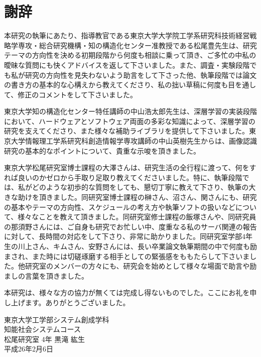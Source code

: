 \chapter*{謝辞}
本研究の執筆にあたり、指導教官である東京大学大学院工学系研究科技術経営戦略学専攻・総合研究機構・知の構造化センター准教授である松尾豊先生は、研究テーマの方向性を決める初期段階から何度も相談に乗って頂き、ご多忙の中私の曖昧な質問にも快くアドバイスを返して下さいました。また、調査・実験段階でも私が研究の方向性を見失わないよう助言をして下さった他、執筆段階では論文の書き方の基本的な心構えから教えてくださり、私の拙い草稿に何度も目を通して、修正のコメントをして下さいました。\par
東京大学知の構造化センター特任講師の中山浩太郎先生は、深層学習の実装段階において、ハードウェアとソフトウェア両面の多彩な知識によって、深層学習の研究を支えてくださり、また様々な補助ライブラリを提供して下さいました。東京大学情報理工学系研究科創造情報学専攻講師の中山英樹先生からは、画像認識研究の基本的なポイントについて、貴重な示唆を頂きました。\par
東京大学松尾研究室博士課程の大澤さんは、研究生活の全行程に渡って、何をすれば良いのかゼロから手取り足取り教えてくださいました。特に、執筆段階では、私がどのような初歩的な質問をしても、懇切丁寧に教えて下さり、執筆の大きな助けを頂きました。同研究室博士課程の榊さん、沼さん、関さんにも、研究の基本やテーマの方向性、スケジュールの考え方や執筆ソフトの扱いなどについて、様々なことを教えて頂きました。同研究室修士課程の飯塚さんや、同研究員の那須野さんには、ご自身も研究でお忙しい中、度重なる私のサーバ関連の報告に対して、長時間の対応をして下さり、非常に助かりました。同研究室学部4年生の川上さん、キムさん、安野さんには、長い卒業論文執筆期間の中で何度も励まされ、また時には切磋琢磨する相手としての緊張感をももたらして下さいました。他研究室のメンバーの方々にも、研究会を始めとして様々な場面で助言や励ましの言葉を頂きました。\par
本研究は、様々な方の協力が無くては完成し得ないものでした。ここにお礼を申し上げます。ありがとうございました。

\begin{flushright}
東京大学工学部システム創成学科 \\
知能社会システムコース\\
松尾研究室 4年 黒滝 紘生\\
平成26年2月6日\\
\end{flushright}